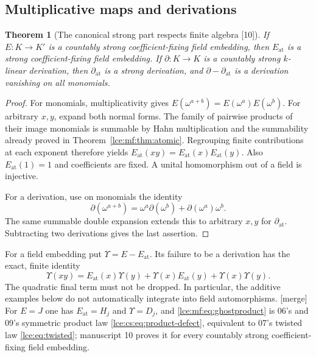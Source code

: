 \documentclass[11pt,letterpaper]{article}
\numberwithin{equation}{section}
\newtheorem{theorem}{Theorem}[section]
\theoremstyle{definition}
\theoremstyle{remark}
\newcommand{\thref}[1]{Theorem~\ref{#1}}
\newcommand{\src}[1]{\textup{\textsf{\small[#1]}}}%
\newcommand{\mergetag}{\textup{\textsf{\small[merge]}}}%
\newcommand{\at}{\mathrm{at}}
\begin{document}
\subsection{Multiplicative maps and derivations}
\begin{theorem}[The canonical strong part respects finite algebra \src{10}]\label{lce:mf:thm:fieldpart}
If $E:K\to K'$ is a countably strong coefficient-fixing field embedding, then
$E_{\at}$ is a strong coefficient-fixing field embedding. If
$\partial:K\to K$ is a countably strong $k$-linear derivation, then
$\partial_{\at}$ is a strong derivation, and $\partial-\partial_{\at}$ is a
derivation vanishing on all monomials.
\end{theorem}
\begin{proof}
For monomials, multiplicativity gives
$E(\omega^{a+b})=E(\omega^a)E(\omega^b)$. For arbitrary $x,y$, expand both
normal forms. The family of pairwise products of their image monomials is
summable by Hahn multiplication and the summability already proved in
\thref{lce:mf:thm:atomic}. Regrouping finite contributions at each exponent
therefore yields $E_{\at}(xy)=E_{\at}(x)E_{\at}(y)$. Also $E_{\at}(1)=1$ and
coefficients are fixed. A unital homomorphism out of a field is injective.

For a derivation, use on monomials the identity
\[
 \partial(\omega^{a+b})=\omega^a\partial(\omega^b)+\partial(\omega^a)\omega^b.
\]
The same summable double expansion extends this to arbitrary $x,y$ for
$\partial_{\at}$. Subtracting two derivations gives the last assertion.
\end{proof}

For a field embedding put $\Upsilon=E-E_{\at}$. Its failure to be a
derivation has the exact, finite identity
\begin{equation}\label{lce:mf:eq:ghostproduct}
 \Upsilon(xy)=E_{\at}(x)\Upsilon(y)+\Upsilon(x)E_{\at}(y)+\Upsilon(x)\Upsilon(y).
\end{equation}
The quadratic final term must not be dropped. In particular, the additive
examples below do not automatically integrate into field automorphisms.
\mergetag{} For $E=J$ one has $E_{\at}=H_j$ and $\Upsilon=D_j$, and
\eqref{lce:mf:eq:ghostproduct} is 06's and 09's symmetric product law
\eqref{lce:cs:eq:product-defect}, equivalent to 07's twisted law
\eqref{lce:eq:twisted}; manuscript 10 proves it for every countably strong
coefficient-fixing field embedding.
\end{document}
